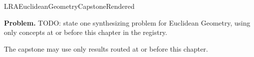 \ifcsname LRAEuclideanGeometryCapstoneRendered\endcsname
\else
\expandafter\gdef\csname LRAEuclideanGeometryCapstoneRendered\endcsname{}

\newpage
{}
\label{cap:euclidean-geometry}

\begin{tcolorbox}[
  colback=gray!6,
  colframe=gray!40,
  arc=2pt,
  left=8pt, right=8pt, top=6pt, bottom=6pt,
  title={\small\textbf{Capstone Problem}},
  fonttitle=\small\bfseries
]
\textbf{Problem.}
TODO: state one synthesizing problem for Euclidean Geometry, using only concepts at or
before this chapter in the registry.
\end{tcolorbox}

\begin{remark*}
The capstone may use only results routed at or before this chapter.
\end{remark*}

\clearpage
\fi
